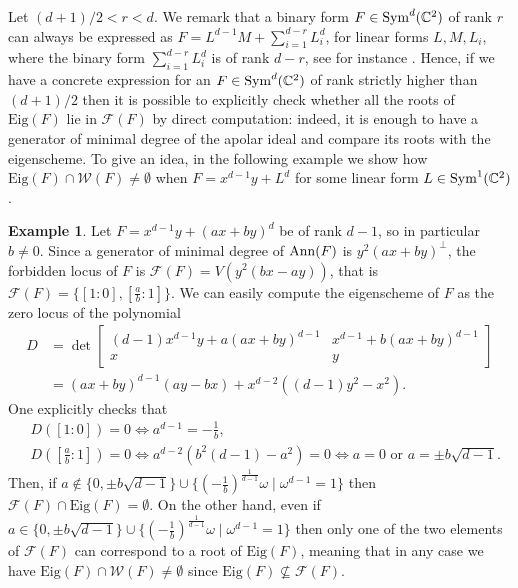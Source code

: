 \documentclass{amsart}
\numberwithin{theorem}{section}
\theoremstyle{definition}
\newtheorem{example}[theorem]{Example}
\newcommand{\Eig}{\mathrm{Eig}}
\newcommand{\W}{\mathcal{W}}
\newcommand{\CC}{\mathbb{C}}
\newcommand{\sym}{\mathop{\rm Sym}\nolimits}
\begin{document}
{
Let $(d+1)/2<r<d$. We remark that a binary form $F\in \sym^d(\CC^2)$ of rank $r$ can always be expressed as $F=L^{d-1}M+\sum_{i=1}^{d-r}L_i^d$, for linear forms $L,M,L_i$, where the binary form $\sum_{i=1}^{d-r}L_i^d $ is of rank $d-r$, see for instance \cite[Proposition 4.3]{buczynski2018locus}.
Hence, if we have a concrete expression for an $F\in \sym^d(\CC^2)$ of rank strictly higher than $(d+1)/2$ then it is possible to explicitly check whether all the roots of $\Eig(F)$ lie in $\mathcal F(F)$ by direct computation: indeed, it is enough to have a generator of minimal degree of the apolar ideal and compare its roots with the eigenscheme. To give an idea, in the following example we show how $\Eig(F)\cap \W(F)\neq \emptyset$ when $F=x^{d-1}y+L^d$ for some linear form $L\in \sym^1(\CC^2)$.
\begin{example}\label{example: rango d-1 waring e eigen si intersecano sempre}
Let $F=x^{d-1}y+(ax+by)^d$ be of rank $d-1$, so in particular $b\neq 0$. Since a generator of minimal degree of ${\rm Ann}(F)$ is $y^2(ax+by)^\perp$, the forbidden locus of $F$ is $\mathcal{F}(F)=V(y^2(bx-ay))$, that is $\mathcal{F}(F)=\{ [1:0],[\frac{a}{b}:1] \}$.
We can easily compute the eigenscheme of $F$ as the zero locus of the polynomial
\begin{align*}
 D&=   \det\begin{bmatrix}
    (d-1)x^{d-1}y+a(ax+by)^{d-1} & x^{d-1}+b(ax+by)^{d-1}\\
    x & y
\end{bmatrix}\\
&=(ax+by)^{d-1}(ay-bx)+x^{d-2}((d-1)y^2-x^2).
\end{align*}
One explicitly checks that
\begin{align*}
 & D([1:0])=0 \iff a^{d-1}=-\frac{1}{b},\\
 &D([\frac{a}{b}:1])=0 \iff a^{d-2}(b^2(d-1)-a^2)=0\iff a=0 \text{ or }a=\pm b\sqrt{d-1}.
\end{align*} 
Then, if $a\notin \{0, \pm b\sqrt{d-1}\} \cup \{\left(-\frac{1}{b}\right)^{\frac{1}{d-1}}\omega \mid \omega^{d-1} = 1\}$  then $\mathcal{F}(F)\cap \Eig(F)=\emptyset$. On the other hand, even if $a\in \{0, \pm b\sqrt{d-1}\} \cup \{\left(-\frac{1}{b}\right)^{\frac{1}{d-1}}\omega \mid \omega^{d-1} = 1\}$ then only one of the two elements of $\mathcal{F}(F)$ can correspond to a root of $\Eig(F)$, meaning that in any case we have $\Eig(F)\cap \W(F)\neq \emptyset$ since $\Eig(F)\not\subseteq \mathcal F(F)$.
\end{example}
}
\end{document}
